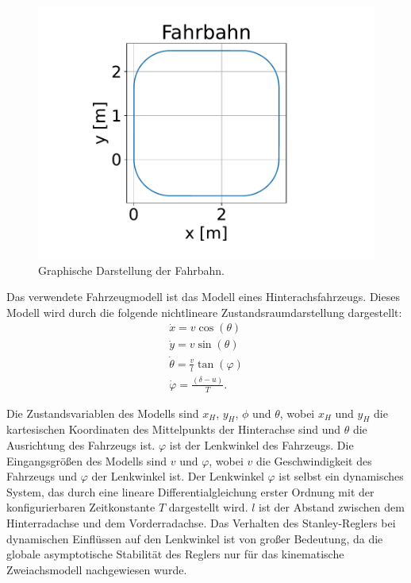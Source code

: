\documentclass[arbeit=studie,oneside,BCOR=12mm]{ArbeitRST}
\begin{document}
\begin{figure}[h]
    \centering
    \includegraphics[scale=0.5]{Fahrbahn}
    \caption{Graphische Darstellung der Fahrbahn.}
    \label{fahrbahn}
\end{figure}


Das verwendete Fahrzeugmodell ist das Modell eines Hinterachsfahrzeugs. Dieses
Modell wird durch die folgende nichtlineare Zustandsraumdarstellung
dargestellt: 
\begin{gather} 
  \dot{x} = v \cos(\theta) \\ 
  \dot{y} = v \sin(\theta) \\ 
  \dot{\theta} = \frac{v}{l}\tan(\varphi) \\
  \dot{\varphi} = \frac{\left(\delta-u\right)}{T}. 
\end{gather}

Die Zustandsvariablen des Modells sind $x_H$, $y_H$, $\phi$ und $\theta$, wobei
$x_H$ und $y_H$ die kartesischen Koordinaten des Mittelpunkts der Hinterachse
sind und $\theta$ die Ausrichtung des Fahrzeugs ist. $\varphi$ ist der
Lenkwinkel des Fahrzeugs. Die Eingangsgrößen des Modells sind $v$ und
$\varphi$, wobei $v$ die Geschwindigkeit des Fahrzeugs und $\varphi$ der
Lenkwinkel ist. Der Lenkwinkel $\varphi$ ist selbst ein dynamisches System, das
durch eine lineare Differentialgleichung erster Ordnung mit der
konfigurierbaren Zeitkonstante $T$ dargestellt wird. $l$ ist der Abstand
zwischen dem Hinterradachse und dem Vorderradachse.  Das Verhalten des
Stanley-Reglers bei dynamischen Einflüssen auf den Lenkwinkel ist von großer
Bedeutung, da die globale asymptotische Stabilität des Reglers nur für das
kinematische Zweiachsmodell nachgewiesen wurde.
\end{document}
